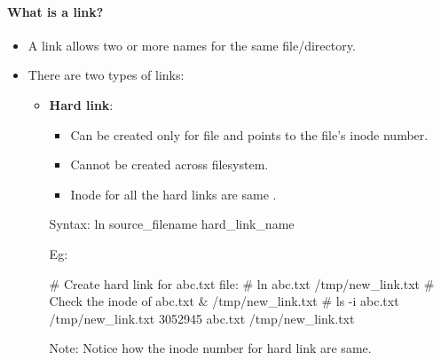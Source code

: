 \setlength{\columnsep}{3pt}
\begin{flushleft}
	\bigskip
	\paragraph{What is a link?}
	\begin{itemize}
		\item A link allows two or more names for the same file/directory.
		\item There are two types of links:
		\begin{itemize}
			\item \textbf{Hard link}:
			\begin{itemize}
				\item Can be created only for file and points to the file's inode number.
				\item Cannot be created across filesystem.
				\item Inode for all the hard links are same .
			\end{itemize}
			
			\bigskip
			\begin{tcolorbox}[breakable,notitle,boxrule=-0pt,colback=pink,colframe=pink]
				\color{black}
				\font=9pt
				Syntax: ln source\_filename  hard\_link\_name
				\font=4pt
			\end{tcolorbox}
			Eg:
			\bigskip
			\begin{tcolorbox}[breakable,notitle,boxrule=-0pt,colback=black,colframe=black]
				\font=9pt
				\color{yellow}
				\# Create hard link for abc.txt file:
				\newline
				\color{green}
				\# ln abc.txt /tmp/new\_link.txt
				\newline
				\newline
				\color{yellow}
				\# Check the inode of abc.txt \& /tmp/new\_link.txt 
				\newline
				\color{green}
				\# ls -i abc.txt  /tmp/new\_link.txt
				\newline
				\color{white}
				3052945 abc.txt
				 /tmp/new\_link.txt
				\font=4pt
			\end{tcolorbox}
			\bigskip
			\begin{tcolorbox}[breakable,notitle,boxrule=1pt,colback=yellow,colframe=yellow]
				\color{black}
				Note: Notice how the inode number for hard link are same.
			\end{tcolorbox}
			

\end{itemize}
\end{itemize}
\end{flushleft}
